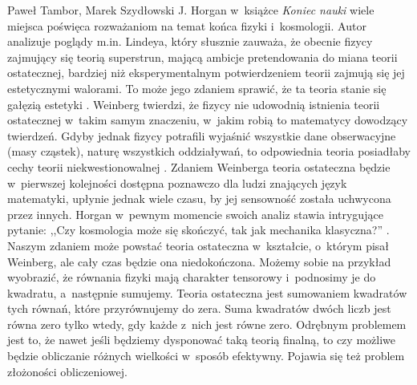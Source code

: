 \begin{artplenv2auth}{Paweł Tambor, Marek Szydłowski}
J. Horgan w~książce \textit{Koniec nauki}
\parencite*[][]{horgan_koniec_1999} %
 wiele miejsca poświęca rozważaniom na temat końca fizyki i~kosmologii. Autor analizuje poglądy m.in. Lindeya, który słusznie zauważa, że obecnie fizycy zajmujący się teorią superstrun, mającą ambicje pretendowania do miana teorii ostatecznej, bardziej niż eksperymentalnym potwierdzeniem teorii zajmują się jej estetycznymi walorami. To może jego zdaniem sprawić, że ta teoria stanie się gałęzią estetyki 
\parencite[][s.~94]{horgan_koniec_1999}. %
 Weinberg twierdzi, że fizycy nie udowodnią istnienia teorii ostatecznej w~takim samym znaczeniu, w~jakim robią to matematycy dowodzący twierdzeń. Gdyby jednak fizycy potrafili wyjaśnić wszystkie dane obserwacyjne (masy cząstek), naturę wszystkich oddziaływań, to odpowiednia teoria posiadłaby cechy teorii niekwestionowalnej 
\parencite[][s.~99]{horgan_koniec_1999}. %
 Zdaniem Weinberga teoria ostateczna będzie w~pierwszej kolejności dostępna poznawczo dla ludzi znających język matematyki, upłynie jednak wiele czasu, by jej sensowność została uchwycona przez innych. Horgan w~pewnym momencie swoich analiz stawia intrygujące pytanie: ,,Czy kosmologia może się skończyć, tak jak mechanika klasyczna?'' 
\parencite[][s.~134]{horgan_koniec_1999}. %
 Naszym zdaniem może powstać teoria ostateczna w~kształcie, o~którym pisał Weinberg, ale cały czas będzie ona niedokończona. Możemy sobie na przykład wyobrazić, że równania fizyki mają charakter tensorowy i~podnosimy je do kwadratu, a~następnie sumujemy. Teoria ostateczna jest sumowaniem kwadratów tych równań, które przyrównujemy do zera. Suma kwadratów dwóch liczb jest równa zero tylko wtedy, gdy każde z~nich jest równe zero. Odrębnym problemem jest to, że nawet jeśli będziemy dysponować taką teorią finalną, to czy możliwe będzie obliczanie różnych wielkości w~sposób efektywny. Pojawia się też problem złożoności obliczeniowej.


\end{artplenv2auth}